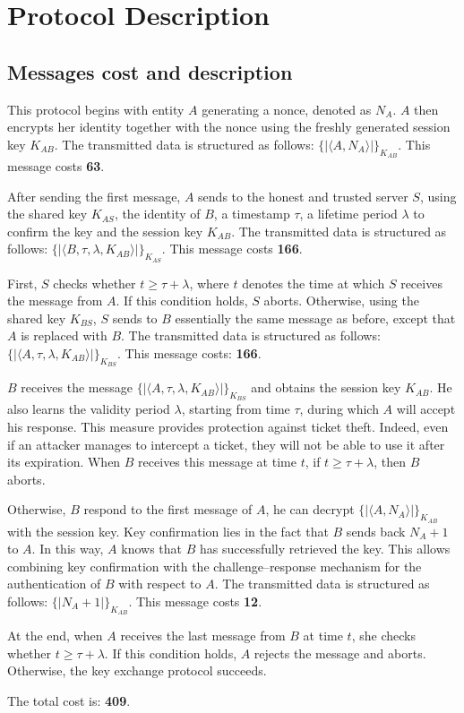\section{Protocol Description}

\subsection{Messages cost and description}



This protocol begins with entity $A$ generating a nonce, denoted as $N_A$. $A$ then encrypts her identity together
with the nonce using the freshly generated session key $K_{AB}$. The transmitted data is structured as follows:
$\{| \langle A,N_A \rangle |\}_{K_{AB}}$. This message costs \textbf{63}.

\vspace{1cm}

After sending the first message, $A$ sends to the honest and trusted server $S$, using the shared key $K_{AS}$,
the identity of $B$, a timestamp $\tau$, a lifetime period $\lambda$ to confirm the key and the session key $K_{AB}$.
The transmitted data is structured as follows: $\{| \langle B, \tau, \lambda, K_{AB} \rangle |\}_{K_{AS}}$. This message costs \textbf{166}.

\vspace{1cm}

First, $S$ checks whether $t \geq \tau + \lambda$, where $t$ denotes the time at which $S$ receives the message from
$A$. If this condition holds, $S$ aborts. Otherwise, using the shared key $K_{BS}$, $S$ sends to $B$ essentially the
same message as before, except that $A$ is replaced with $B$. The transmitted data is structured as follows:
$\{| \langle A, \tau, \lambda, K_{AB} \rangle |\}_{K_{BS}}$. This message costs: \textbf{166}.

\vspace{1cm}

$B$ receives the message $\{| \langle A, \tau, \lambda, K_{AB} \rangle |\}_{K_{BS}}$ and obtains the session key $K_{AB}$.
He also learns the validity period $\lambda$, starting from time $\tau$, during which $A$ will accept his response.
This measure provides protection against ticket theft. Indeed, even if an attacker manages to intercept a ticket,
they will not be able to use it after its expiration. When $B$ receives this message at time $t$, if
$t \geq \tau + \lambda$, then $B$ aborts.

Otherwise, $B$ respond to the first message of $A$, he can decrypt $\{| \langle A, N_A \rangle |\}_{K_{AB}}$ with the session key.
Key confirmation lies in the fact that $B$ sends back $N_A + 1$ to $A$. In this way, $A$ knows that $B$ has successfully
retrieved the key. This allows combining key confirmation with the challenge–response mechanism for the authentication
of $B$ with respect to $A$. The transmitted data is structured as follows: $\{| N_A + 1|\}_{K_{AB}}$.
This message costs \textbf{12}.

\vspace{1cm}


At the end, when $A$ receives the last message from $B$ at time $t$, she checks whether $t \geq \tau + \lambda$. If
this condition holds, $A$ rejects the message and aborts. Otherwise, the key exchange protocol succeeds.
\vspace{1cm}

The total cost is: \textbf{409}.